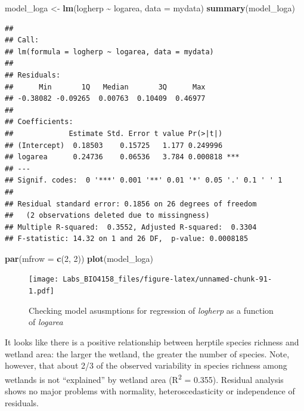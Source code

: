 \documentclass[
  12pt,
]{book}
\newenvironment{Shaded}{\begin{snugshade}}{\end{snugshade}}
\newcommand{\DataTypeTok}[1]{\textcolor[rgb]{0.13,0.29,0.53}{#1}}
\newcommand{\DecValTok}[1]{\textcolor[rgb]{0.00,0.00,0.81}{#1}}
\newcommand{\KeywordTok}[1]{\textcolor[rgb]{0.13,0.29,0.53}{\textbf{#1}}}
\newcommand{\NormalTok}[1]{#1}
\newcommand{\OperatorTok}[1]{\textcolor[rgb]{0.81,0.36,0.00}{\textbf{#1}}}
\newcommand{\StringTok}[1]{\textcolor[rgb]{0.31,0.60,0.02}{#1}}
\begin{document}
\begin{Shaded}
\begin{Highlighting}[]
\NormalTok{model\_loga \textless{}{-}}\StringTok{ }\KeywordTok{lm}\NormalTok{(logherp }\OperatorTok{\textasciitilde{}}\StringTok{ }\NormalTok{logarea, }\DataTypeTok{data =}\NormalTok{ mydata)}
\KeywordTok{summary}\NormalTok{(model\_loga)}
\end{Highlighting}
\end{Shaded}

\begin{verbatim}
## 
## Call:
## lm(formula = logherp ~ logarea, data = mydata)
## 
## Residuals:
##      Min       1Q   Median       3Q      Max 
## -0.38082 -0.09265  0.00763  0.10409  0.46977 
## 
## Coefficients:
##             Estimate Std. Error t value Pr(>|t|)    
## (Intercept)  0.18503    0.15725   1.177 0.249996    
## logarea      0.24736    0.06536   3.784 0.000818 ***
## ---
## Signif. codes:  0 '***' 0.001 '**' 0.01 '*' 0.05 '.' 0.1 ' ' 1
## 
## Residual standard error: 0.1856 on 26 degrees of freedom
##   (2 observations deleted due to missingness)
## Multiple R-squared:  0.3552, Adjusted R-squared:  0.3304 
## F-statistic: 14.32 on 1 and 26 DF,  p-value: 0.0008185
\end{verbatim}

\begin{Shaded}
\begin{Highlighting}[]
\KeywordTok{par}\NormalTok{(}\DataTypeTok{mfrow =} \KeywordTok{c}\NormalTok{(}\DecValTok{2}\NormalTok{, }\DecValTok{2}\NormalTok{))}
\KeywordTok{plot}\NormalTok{(model\_loga)}
\end{Highlighting}
\end{Shaded}

\begin{figure}
\centering
\texttt{[image: Labs\_BIO4158\_files/figure-latex/unnamed-chunk-91-1.pdf]}
\caption{\label{fig:unnamed-chunk-91}Checking model asusmptions for regression of \emph{logherp} as a function of \emph{logarea}}
\end{figure}

It looks like there is a positive relationship between herptile species richness and wetland area: the larger the wetland, the greater the number of species. Note, however, that about 2/3 of the observed variability in species richness among wetlands is not ``explained'' by wetland area (R\textsuperscript{2} = 0.355). Residual analysis shows no major problems with normality, heteroscedasticity or independence of residuals.
\end{document}

